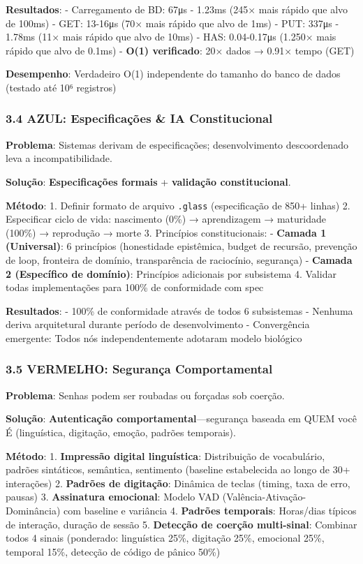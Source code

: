 \documentclass[
]{article}
\begin{document}
\textbf{Resultados}: - Carregamento de BD: 67μs - 1.23ms (245× mais
rápido que alvo de 100ms) - GET: 13-16μs (70× mais rápido que alvo de
1ms) - PUT: 337μs - 1.78ms (11× mais rápido que alvo de 10ms) - HAS:
0.04-0.17μs (1.250× mais rápido que alvo de 0.1ms) - \textbf{O(1)
verificado}: 20× dados → 0.91× tempo (GET)

\textbf{Desempenho}: Verdadeiro O(1) independente do tamanho do banco de
dados (testado até 10⁶ registros)

\subsubsection{3.4 AZUL: Especificações \& IA
Constitucional}\label{azul-especificauxe7uxf5es-ia-constitucional}

\textbf{Problema}: Sistemas derivam de especificações; desenvolvimento
descoordenado leva a incompatibilidade.

\textbf{Solução}: \textbf{Especificações formais} + \textbf{validação
constitucional}.

\textbf{Método}: 1. Definir formato de arquivo \texttt{.glass}
(especificação de 850+ linhas) 2. Especificar ciclo de vida: nascimento
(0\%) → aprendizagem → maturidade (100\%) → reprodução → morte 3.
Princípios constitucionais: - \textbf{Camada 1 (Universal)}: 6
princípios (honestidade epistêmica, budget de recursão, prevenção de
loop, fronteira de domínio, transparência de raciocínio, segurança) -
\textbf{Camada 2 (Específico de domínio)}: Princípios adicionais por
subsistema 4. Validar todas implementações para 100\% de conformidade
com spec

\textbf{Resultados}: - 100\% de conformidade através de todos 6
subsistemas - Nenhuma deriva arquitetural durante período de
desenvolvimento - Convergência emergente: Todos nós independentemente
adotaram modelo biológico

\subsubsection{3.5 VERMELHO: Segurança
Comportamental}\label{vermelho-seguranuxe7a-comportamental}

\textbf{Problema}: Senhas podem ser roubadas ou forçadas sob coerção.

\textbf{Solução}: \textbf{Autenticação comportamental}---segurança
baseada em QUEM você É (linguística, digitação, emoção, padrões
temporais).

\textbf{Método}: 1. \textbf{Impressão digital linguística}: Distribuição
de vocabulário, padrões sintáticos, semântica, sentimento (baseline
estabelecida ao longo de 30+ interações) 2. \textbf{Padrões de
digitação}: Dinâmica de teclas (timing, taxa de erro, pausas) 3.
\textbf{Assinatura emocional}: Modelo VAD (Valência-Ativação-Dominância)
com baseline e variância 4. \textbf{Padrões temporais}: Horas/dias
típicos de interação, duração de sessão 5. \textbf{Detecção de coerção
multi-sinal}: Combinar todos 4 sinais (ponderado: linguística 25\%,
digitação 25\%, emocional 25\%, temporal 15\%, detecção de código de
pânico 50\%)
\end{document}
